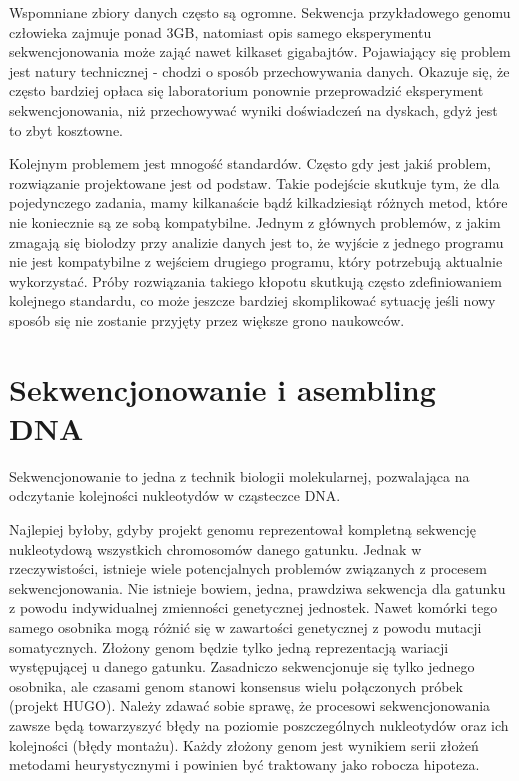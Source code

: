 Wspomniane zbiory danych często są ogromne. 
Sekwencja przykładowego genomu człowieka zajmuje ponad 3GB, natomiast opis samego eksperymentu sekwencjonowania może zająć nawet kilkaset gigabajtów. 
Pojawiający się problem jest natury technicznej - chodzi o sposób przechowywania danych.
Okazuje się, że często bardziej opłaca się laboratorium ponownie przeprowadzić eksperyment sekwencjonowania, niż przechowywać wyniki doświadczeń na dyskach, gdyż jest to zbyt kosztowne.

Kolejnym problemem jest mnogość standardów. 
Często gdy jest jakiś problem, rozwiązanie projektowane jest od podstaw. 
Takie podejście skutkuje tym, że dla pojedynczego zadania, mamy kilkanaście bądź kilkadziesiąt różnych metod, które nie koniecznie są ze sobą kompatybilne. 
Jednym z głównych problemów, z jakim zmagają się biolodzy przy analizie danych jest to, że wyjście z jednego programu nie jest kompatybilne z wejściem drugiego programu, który potrzebują aktualnie wykorzystać. 
Próby rozwiązania takiego kłopotu skutkują często zdefiniowaniem kolejnego standardu, co może jeszcze bardziej skomplikować sytuację jeśli nowy sposób się nie zostanie przyjęty przez większe grono naukowców.


\section{Sekwencjonowanie i asembling DNA}
Sekwencjonowanie to jedna z technik biologii molekularnej, pozwalająca na odczytanie kolejności nukleotydów w cząsteczce DNA.

Najlepiej byłoby, gdyby projekt genomu reprezentował kompletną sekwencję nukleotydową wszystkich chromosomów danego gatunku. 
Jednak w rzeczywistości, istnieje wiele potencjalnych problemów związanych z procesem sekwencjonowania. Nie istnieje bowiem, jedna, prawdziwa sekwencja dla gatunku z powodu indywidualnej zmienności genetycznej jednostek. 
Nawet komórki tego samego osobnika mogą różnić się w zawartości genetycznej z powodu mutacji somatycznych. Złożony genom będzie tylko jedną reprezentacją wariacji występującej u danego gatunku. 
Zasadniczo sekwencjonuje się tylko jednego osobnika, ale czasami genom stanowi konsensus wielu połączonych próbek (projekt HUGO). 
Należy zdawać sobie sprawę, że procesowi sekwencjonowania zawsze będą towarzyszyć błędy na poziomie poszczególnych nukleotydów oraz ich kolejności (błędy montażu). 
Każdy złożony genom jest wynikiem serii złożeń metodami heurystycznymi i powinien być traktowany jako robocza hipoteza.


